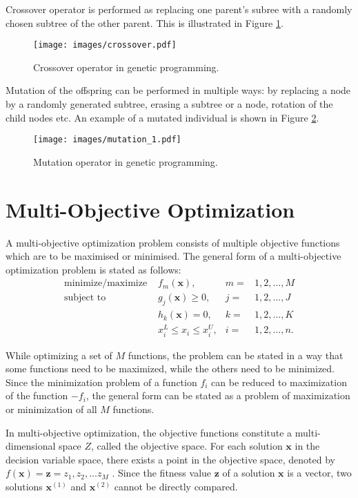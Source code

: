 Crossover operator is performed as replacing one parent's subree with a randomly chosen subtree of the other parent.
This is illustrated in Figure \ref{genprog:ex2}.
\begin{figure}[ht]
    \centering
    \texttt{[image: images/crossover.pdf]}
    \caption{Crossover operator in genetic programming.}
    \label{genprog:ex2}
\end{figure}

Mutation of the offspring can be performed in multiple ways: by replacing a node by a randomly generated subtree, erasing a subtree or a node, rotation of the child nodes etc.
An example of a mutated individual is shown in Figure \ref{genprog:ex3}.
\begin{figure}[H]
    \centering
    \texttt{[image: images/mutation\_1.pdf]}
    \caption{Mutation operator in genetic programming.}
    \label{genprog:ex3}
\end{figure}

\newpage
\section{Multi-Objective Optimization}
A multi-objective optimization problem consists of multiple objective functions which are to be maximised or minimised. 
The general form of a multi-objective optimization problem is stated as follows:
\begin{align*}
\text{minimize/maximize } & f_m(\textbf{x}),  & m = & 1, 2, ..., M \\
\text{subject to } & g_j(\textbf{x}) \geq 0, & j = & 1, 2, ..., J \\
           & h_k(\textbf{x}) = 0, & k = & 1, 2, ..., K \\
           & x_{i}^{L} \leq x_i \leq x_{i}^{U}, & i = & 1, 2, ..., n. 
\end{align*}

While optimizing a set of $M$ functions, the problem can be stated in a way that some functions need to be maximized, while the others need to be minimized. 
Since the minimization problem of a function $f_i$ can be reduced to maximization of the function $-f_i$, the general form can be stated as a problem of maximization or minimization of all $M$ functions.

In multi-objective optimization, the objective functions constitute a multi-dimensional space $Z$, called the objective space. 
For each solution $\textbf{x}$ in the decision variable space, there exists a point in the objective space, denoted by $f(\textbf{x}) = \textbf{z} = {z_1, z_2, ... z_M}$ 
\cite{deb2001multi}. 
Since the fitness value $\textbf{z}$ of a solution $\textbf{x}$ is a vector, two solutions 
$\textbf{x}^{(1)}$ and $\textbf{x}^{(2)}$ cannot be directly compared. 

